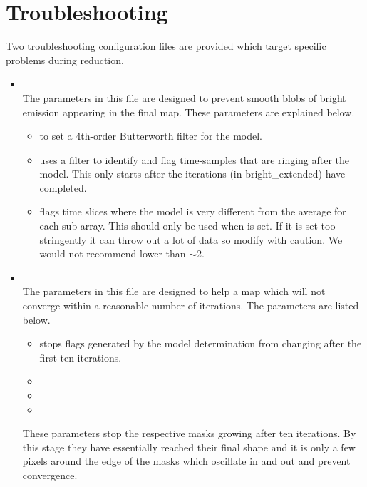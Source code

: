 \documentclass[11pt,oneside,chapters]{starlink}
\begin{document}
\section{Troubleshooting}
Two troubleshooting configuration files are provided which target specific
problems during reduction.

\begin{itemize}

\item {}\\
The parameters in this file are designed to prevent smooth blobs of bright
emission appearing in the final map. These parameters are explained below.

\begin{itemize}[nolistsep]
\item {} to set a 4th-order Butterworth
  filter for the  model.

  \item {} uses a filter to identify and flag
  time-samples that are ringing after the  model. This only starts
  after the  iterations (in bright\_extended) have completed.
  \item {} flags time slices where the
   model is very different from the average for each
  sub-array. This should only be used when  is set. If
  it is set too stringently it can throw out a lot of data so modify with
  caution. We would not recommend lower than $\sim$2.
\end{itemize}
\end{itemize}

\begin{itemize}
\item {}\\
The parameters in this file are designed to help a map which will not
converge within a reasonable number of iterations. The parameters are
listed below.
\begin{itemize}[nolistsep]
\item {} stops flags generated by the 
model determination from changing after the first ten iterations.
\item {}
\item {}
\item {}
\end{itemize}
These  parameters stop the respective masks
growing after ten iterations. By this stage they have essentially reached
their final shape and it is only a few pixels around the edge of the masks
which oscillate in and out and prevent convergence.
\end{itemize}
\end{document}
